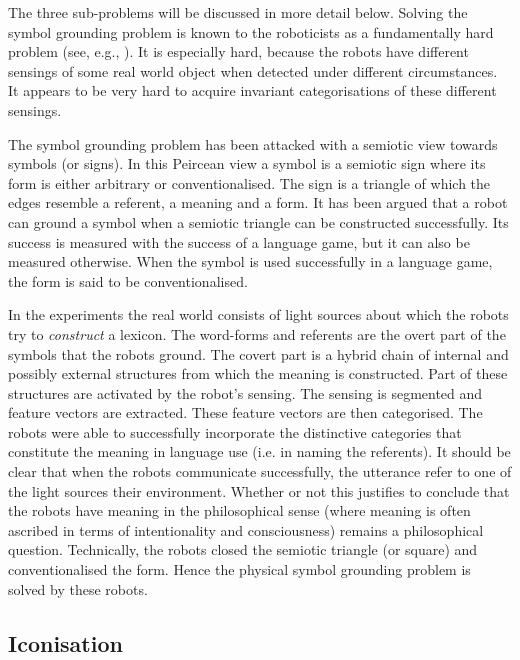 The three sub-problems will be discussed in more detail below. Solving the symbol grounding problem is known to the roboticists as a fundamentally hard problem (see, e.g., \citealt{pfeiferscheier:1999}). It is especially hard, because the robots have different sensings of some real world object when detected under different circumstances. It appears to be very hard to acquire invariant categorisations of these different sensings.

The symbol grounding problem has been attacked with a semiotic view towards symbols (or signs). In this Peircean view a symbol is a semiotic sign where its form is either arbitrary or conventionalised. The sign is a triangle of which the edges resemble a referent, a meaning and a form. It has been argued that a robot can ground a symbol when a semiotic triangle can be constructed successfully. Its success is measured with the success of a language game, but it can also be measured otherwise. When the symbol is used successfully in a language game, the form is said to be conventionalised.

In the experiments the real world consists of light sources about which the robots try to {\em construct} a lexicon. The word-forms and referents are the overt part of the symbols that the robots ground. The covert part is a hybrid chain of internal and possibly external structures from which the meaning is constructed. Part of these structures are activated by the robot's sensing. The sensing is segmented and feature vectors are extracted. These feature vectors are then categorised. The robots were able to successfully incorporate the distinctive categories that constitute the meaning in language use (i.e. in naming the referents). It should be clear that when the robots communicate successfully, the utterance refer to one of the light sources their environment. Whether or not this justifies to conclude that the robots have meaning in the philosophical sense (where meaning is often ascribed in terms of intentionality and consciousness) remains a philosophical question. Technically, the robots closed the semiotic triangle (or square) and conventionalised the form. Hence the physical symbol grounding problem is solved by these robots.

\subsection{Iconisation}


